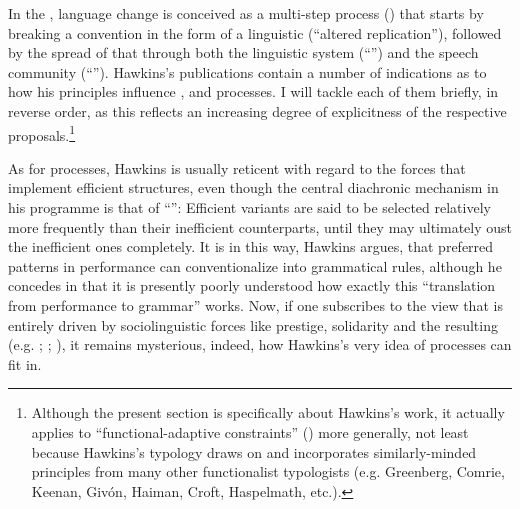 \documentclass[output=paper]{langsci/langscibook}
\begin{document}
In the , language change is conceived as a multi-step process (\citealt{Croft2000_Change,Croft2006_Change,Aitchison2013_Change}) that starts by breaking a convention in the form of a linguistic  (“altered replication”), followed by the spread of that  through both the linguistic system (“”) and the speech community (“”). Hawkins’s publications contain a number of indications as to how his  principles influence ,  and  processes. I will tackle each of them briefly, in reverse order, as this reflects an increasing degree of explicitness of the respective proposals.\footnote{Although the present section is specifically about Hawkins’s work, it actually applies to “functional-adaptive constraints” () more generally, not least because Hawkins’s  typology draws on and incorporates similarly-minded principles from many other functionalist typologists (e.g. Greenberg, Comrie, Keenan, Givón, Haiman, Croft, Haspelmath, etc.).}

As for \textsc{} processes, Hawkins is usually reticent with regard to the forces that implement efficient structures, even though the central diachronic mechanism in his programme is that of “”: Efficient variants are said to be selected relatively more frequently than their inefficient counterparts, until they may ultimately oust the inefficient ones completely. It is in this way, Hawkins argues, that preferred patterns in performance can conventionalize into grammatical rules, although he concedes in \citet[10]{Hawkins2014_VarEff} that it is presently poorly understood how exactly this “translation from performance to grammar” works. Now, if one subscribes to the view that  is entirely driven by sociolinguistic forces like prestige, solidarity and the resulting  (e.g. \citealt{Croft2000_Change}; \citealt{Cristofaro2017_Dep}; ), it remains mysterious, indeed, how Hawkins’s very idea of  processes can fit in. 
\end{document}
